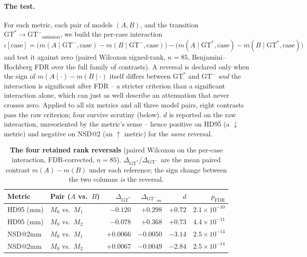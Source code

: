 \documentclass[
    bookmarks, bookmarksnumbered, bookmarksopen,
    colorlinks=true, citecolor=blue, linkcolor=blue, urlcolor=blue
]{techrep}
\newcommand{\gtstar}{\ensuremath{\mathrm{GT}^{\!*}}}
\newcommand{\gtminus}{\ensuremath{\mathrm{GT}^{\!-}}}
\begin{document}
\paragraph{The test.} For each metric, each pair of models $(A,B)$, and the transition
$\gtstar\to\gtminus_{\text{omission}}$, we build the per-case interaction
$\iota[\text{case}] = \big(m(A\mid\gtminus,\text{case})-m(B\mid\gtminus,\text{case})\big) -
\big(m(A\mid\gtstar,\text{case})-m(B\mid\gtstar,\text{case})\big)$ and test it against zero
(paired Wilcoxon signed-rank, $n{=}85$, Benjamini--Hochberg FDR over the full family of contrasts).
A reversal is declared only when the sign of $m(A\mid\cdot)-m(B\mid\cdot)$ itself differs between
$\gtstar$ and $\gtminus$ \emph{and} the interaction is significant after FDR -- a stricter criterion
than a significant interaction alone, which can just as well describe an attenuation that never
crosses zero. Applied to all six metrics and all three model pairs, eight contrasts pass the raw
criterion; four survive scrutiny (below). $d$ is reported on the raw interaction, unreoriented by
the metric's sense -- hence positive on HD95 (a $\downarrow$ metric) and negative on NSD@2 (an
$\uparrow$ metric) for the \emph{same} reversal.

\begin{table}[htb]
  \centering
  \caption{\textbf{The four retained rank reversals} (paired Wilcoxon on the per-case
  interaction, FDR-corrected, $n{=}85$). $\Delta_{\gtstar}$/$\Delta_{\gtminus}$ are the mean
  paired contrast $m(A)-m(B)$ under each reference; the sign change between the two columns
  \emph{is} the reversal.}
  \label{tab:reversal}
  \small
  \begin{tabular}{llrrrr}
    \toprule
    Metric & Pair ($A$ vs.\ $B$) & $\Delta_{\gtstar}$ & $\Delta_{\gtminus_{\text{om}}}$ & $d$ & $p_{\text{FDR}}$ \\
    \midrule
    HD95 (mm) & $M_0$ vs.\ $M_1$ & $-0.120$ & $+0.298$ & $+0.72$ & $2.1\times10^{-10}$ \\
    HD95 (mm) & $M_0$ vs.\ $M_2$ & $-0.078$ & $+0.368$ & $+0.73$ & $4.4\times10^{-11}$ \\
    NSD@2mm & $M_0$ vs.\ $M_1$ & $+0.0066$ & $-0.0050$ & $-3.14$ & $2.5\times10^{-14}$ \\
    NSD@2mm & $M_0$ vs.\ $M_2$ & $+0.0067$ & $-0.0049$ & $-2.84$ & $2.5\times10^{-14}$ \\
    \bottomrule
  \end{tabular}
\end{table}
\end{document}
